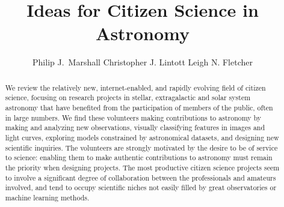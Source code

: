 \documentclass{ar2e}
\begin{document}

\jvol{}
\ARinfo{}

\title{Ideas for Citizen Science in Astronomy}

\author{%
Philip J.\ Marshall
Christopher J. Lintott
Leigh N. Fletcher
}




\begin{abstract} 

We review the relatively new, internet-enabled, and rapidly evolving field of
citizen science, focusing on research projects in stellar, extragalactic and 
solar system astronomy that have benefited from the participation of members
of the public, often in large numbers. We find these volunteers making
contributions to astronomy by making and analyzing new observations, visually
classifying features in images and light curves, exploring models constrained
by astronomical datasets, and designing new scientific inquiries. The 
volunteers are strongly motivated by the desire to be of service to science:
enabling them to make authentic contributions to astronomy must remain the
priority when designing projects.  The most productive citizen science
projects seem to involve a significant degree of collaboration between the
professionals and amateurs involved, and tend to occupy scientific niches not
easily filled by great observatories or machine learning methods. 

\end{abstract}

\maketitle
\end{document}
